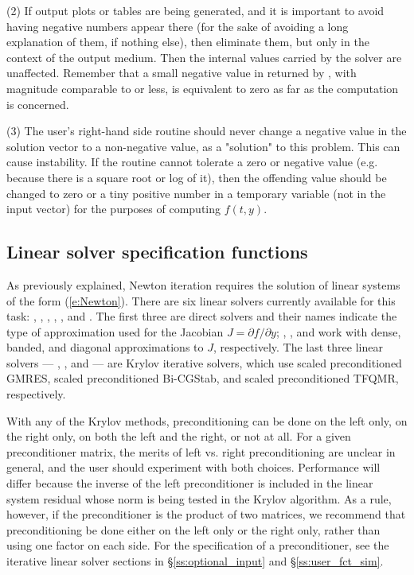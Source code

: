 (2) If output plots or tables are being generated, and it is important
to avoid having negative numbers appear there (for the sake of avoiding
a long explanation of them, if nothing else), then eliminate them, but
only in the context of the output medium.  Then the internal values carried
by the solver are unaffected.  Remember that a small negative value in 
returned by {\cvodes}, with magnitude comparable to  or less,
is equivalent to zero as far as the computation is concerned.

(3) The user's right-hand side routine  should never change a
negative value in the solution vector  to a non-negative value,
as a "solution" to this problem.  This can cause instability.  If the
 routine cannot tolerate a zero or negative value (e.g. because
there is a square root or log of it), then the offending value should
be changed to zero or a tiny positive number in a temporary variable
(not in the input  vector) for the purposes of computing $f(t,y)$.


\subsection{Linear solver specification functions}\label{sss:lin_solv_init}

As previously explained, Newton iteration requires the solution of
linear systems of the form (\ref{e:Newton}).  There are six {\cvodes} linear
solvers currently available for this task: {\cvdense}, {\cvband}, {\cvdiag},
{\cvspgmr}, {\cvspbcg}, and {\cvsptfqmr}.  The first three are direct solvers
and their names indicate the type of approximation used for the Jacobian 
$J = \partial{f}/\partial{y}$; {\cvdense}, {\cvband}, and {\cvdiag} work with
dense, banded, and diagonal approximations to $J$, respectively.  The last
three {\cvodes} linear solvers --- {\cvspgmr}, {\cvspbcg}, and {\cvsptfqmr} ---
are Krylov iterative solvers, which use scaled preconditioned GMRES, scaled
preconditioned Bi-CGStab, and scaled preconditioned TFQMR, respectively.

With any of the Krylov methods, preconditioning 
can be done on the left only, on the right only, on both the left and the right, 
or not at all.  For a given preconditioner matrix, the merits of left vs. right
preconditioning are unclear in general, and the user should experiment
with both choices.  Performance will differ because the inverse of the
left preconditioner is included in the linear system residual whose
norm is being tested in the Krylov algorithm.  As a rule, however, if
the preconditioner is the product of two matrices, we recommend that
preconditioning be done either on the left only or the right only,
rather than using one factor on each side. For the specification of a
preconditioner, see the iterative linear solver sections in \S\ref{ss:optional_input} 
and \S\ref{ss:user_fct_sim}.

